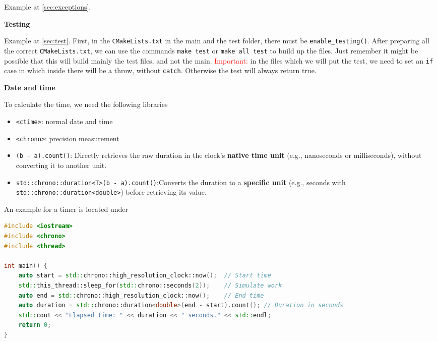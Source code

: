 \documentclass[fontsize=8pt, a4paper, landscape, fleqn]{scrartcl}
\renewcommand{\section}[1]{%
    \noindent\colorbox{sectioncolor}{%
        \parbox{\dimexpr\columnwidth-2\fboxsep}{\color{white}\textbf{#1}}}%
    \vspace{0.5mm}%
}
\begin{document}
\begin{multicols*}{3}[\raggedcolumns]
    Example at \colorbox{purple!7}{\autoref{sec:exceptions}}.
    
	\section{Testing}

    Example at \colorbox{yellow!7}{\autoref{sec:test}}.
    First, in the \lstinline{CMakeLists.txt} in the main and the test folder, there must be \lstinline{enable_testing()}. After preparing all the correct \lstinline{CMakeLists.txt}, we can use the commands \lstinline{make test} or \lstinline{make all test} to build up the files. Just remember it might be possible that this will build mainly the test files, and not the main. 
    \textcolor{red}{Important:} in the files which we will put the test, we need to set an \lstinline{if} case in which inside there will be a throw, without \lstinline{catch}. Otherwise the test will always return true.

	\section{Date and time}
    To calculate the time, we need the following libraries
    \begin{itemize}
        \item \lstinline{<ctime>}: normal date and time
        \item \lstinline{<chrono>}: precision measurement
    \end{itemize}
    \begin{itemize}
    \item \texttt{(b - a).count()}: Directly retrieves the raw duration in the clock's \textbf{native time unit} (e.g., nanoseconds or milliseconds), without converting it to another unit.
    \item \texttt{std::chrono::duration<T>(b - a).count()}:Converts the duration to a \textbf{specific unit} (e.g., seconds with \texttt{std::chrono::duration<double>}) before retrieving its value.
\end{itemize}
    An example for a timer is located under \begin{lstlisting}[language=C++]
#include <iostream>
#include <chrono>
#include <thread>

int main() {
    auto start = std::chrono::high_resolution_clock::now();  // Start time
    std::this_thread::sleep_for(std::chrono::seconds(2));    // Simulate work
    auto end = std::chrono::high_resolution_clock::now();    // End time
    auto duration = std::chrono::duration<double>(end - start).count(); // Duration in seconds
    std::cout << "Elapsed time: " << duration << " seconds." << std::endl;
    return 0;
}
\end{lstlisting}
 

\end{multicols*}
\end{document}
